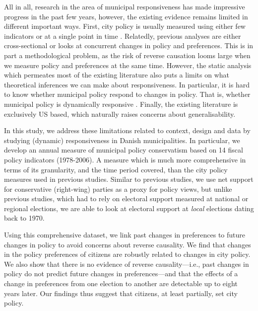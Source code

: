 \documentclass[a4paper,12pt]{article}
\begin{document}
All in all, research in the area of municipal responsiveness has made impressive progress in the past few years, however, the existing evidence remains limited in different important ways. First, city policy is usually measured using either few indicators \citep{sances2017voters,einstein2016pushing} or at a single point in time \citep{tausanovitch2014representation}. Relatedly, previous analyses are either cross-sectional or looks at concurrent changes in policy and preferences. This is in part a methodological problem, as the risk of reverse causation looms large when we measure policy and preferences at the same time. However, the static analysis which permeates most of the existing literature also puts a limits on what theoretical inferences we can make about responsiveness. In particular, it is hard to know whether municipal policy respond to changes in policy. That is, whether municipal policy is dynamically responsive \citep{stimson1995dynamic}. Finally, the existing literature is exclusively US based, which naturally raises concerns about generalisability.

In this study, we address these limitations related to context, design and data by studying (dynamic) responsiveness in Danish municipalities. In particular, we develop an annual measure of municipal policy conservatism based on 14 fiscal policy indicators (1978-2006). A measure which is much more comprehensive in terms of its granularity, and the time period covered, than the city policy measures used in previous studies. Similar to previous studies, we use net support for conservative (right-wing) parties as a proxy for policy views, but unlike previous studies, which had to rely on electoral support measured at national or regional elections, we are able to look at electoral support at \textit{local} elections dating back to 1970. 

Using this comprehensive dataset, we link past changes in preferences to future changes in policy to avoid concerns about reverse causality. We find that changes in the policy preferences of citizens are robustly related to changes in city policy. We also show that there is no evidence of reverse causality---i.e., past changes in policy do not predict future changes in preferences---and that the effects of a change in preferences from one election to another are detectable up to eight years later. Our findings thus suggest that citizens, at least partially, set city policy.

\end{document}
